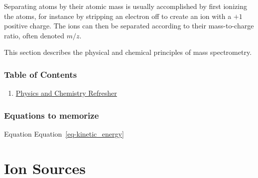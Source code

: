 \documentclass[
  letterpaper,
  DIV=11,
  numbers=noendperiod]{scrreprt}
\providecommand{\tightlist}{%
  \setlength{\itemsep}{0pt}\setlength{\parskip}{0pt}}\usepackage{longtable,booktabs,array}
\begin{document}
Separating atoms by their atomic mass is usually accomplished by first
ionizing the atoms, for instance by stripping an electron off to create
an ion with a \(+1\) positive charge. The ions can then be separated
according to their mass-to-charge ratio, often denoted \(m/z\).

This section describes the physical and chemical principles of mass
spectrometry.

\subsection{Table of Contents}\label{table-of-contents}

\begin{enumerate}
\def\labelenumi{\arabic{enumi}.}
\tightlist
\item
  \href{background.qmd}{Physics and Chemistry Refresher}
\end{enumerate}

\subsection{Equations to memorize}\label{equations-to-memorize}

Equation Equation~\ref{eq-kinetic_energy}


\chapter{Ion Sources}\label{ion-sources}
\end{document}
